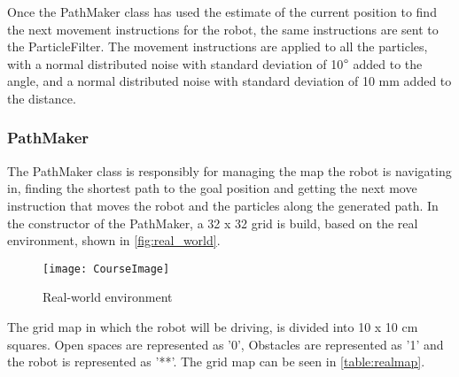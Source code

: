 \documentclass[Main]{subfiles}
\begin{document}
	Once the PathMaker class has used the estimate of the current position to find the next movement instructions for the robot, the same instructions are sent to the ParticleFilter.
	The movement instructions are applied to all the particles, with a normal distributed noise with standard deviation of 10$\degree$ added to the angle, and a normal distributed noise with standard deviation of 10 mm added to the distance.
	
		\subsubsection{PathMaker} %
	\label{subsub:software_pathmaker}
	
	The PathMaker class is responsibly for managing the map the robot is navigating in, finding the shortest path to the goal position and getting the next move instruction that moves the robot and the particles along the generated path.
	In the constructor of the PathMaker, a 32 x 32 grid is build, based on the real environment, shown in \autoref{fig:real_world}. 
	\vspace{12pt} 
	\begin{figure}[H]
		\centering
		\texttt{[image: CourseImage]}
		\caption{Real-world environment}
		\label{fig:real_world}
	\end{figure}

	\newpage
	The grid map in which the robot will be driving, is divided into 10 x 10 cm squares. 
	Open spaces are represented as '0', Obstacles are represented as '1' and the robot is represented as '**'. The grid map can be seen in \autoref{table:realmap}.	
\end{document}
